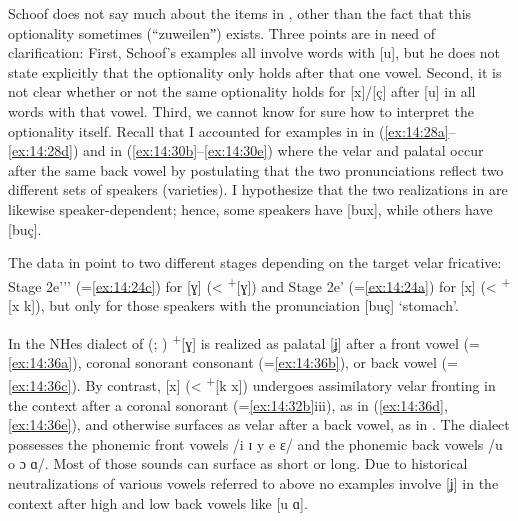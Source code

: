 Schoof does not say much about the items in , other than the fact that this optionality sometimes (“zuweilenˮ) exists. Three points are in need of clarification: First, Schoof’s examples all involve words with [u], but he does not state explicitly that the optionality only holds after that one vowel. Second, it is not clear whether or not the same optionality holds for [x]/[ç] after [u] in all words with that vowel. Third, we cannot know for sure how to interpret the optionality itself. Recall that I accounted for examples in  in (\ref{ex:14:28a}--\ref{ex:14:28d}) and  in (\ref{ex:14:30b}--\ref{ex:14:30e}) where the velar and palatal occur after the same back vowel by postulating that the two pronunciations reflect two different sets of speakers (varieties). I hypothesize that the two realizations in  are likewise speaker-dependent; hence, some speakers have [bux], while others have [buç].

The data in  point to two different stages depending on the target velar fricative: Stage 2e'{}'{}' (=\ref{ex:14:24c}) for [ɣ] (< \textsuperscript{+}[ɣ]) and Stage 2e' (=\ref{ex:14:24a}) for [x] (< \textsuperscript{+}[x k]), but only for those speakers with the pronunciation [buç] ‘stomach’.

In the NHes dialect of  (\citealt{Dittmar1891}; )  \textsuperscript{+}[ɣ] is realized as palatal [ʝ] after a front vowel (=\ref{ex:14:36a}), coronal sonorant consonant (=\ref{ex:14:36b}), or back vowel (=\ref{ex:14:36c}). By contrast, [x] (< \textsuperscript{+}[k x]) undergoes assimilatory velar fronting in the context after a coronal sonorant (=\ref{ex:14:32b}iii), as in (\ref{ex:14:36d}, \ref{ex:14:36e}), and otherwise surfaces as velar after a back vowel, as in . The dialect possesses the phonemic front vowels /i ɪ y e ɛ/ and the phonemic back vowels /u o ɔ ɑ/. Most of those sounds can surface as short or long. Due to historical neutralizations of various vowels referred to above no examples involve [ʝ] in the context after high and low back vowels like [u ɑ].


